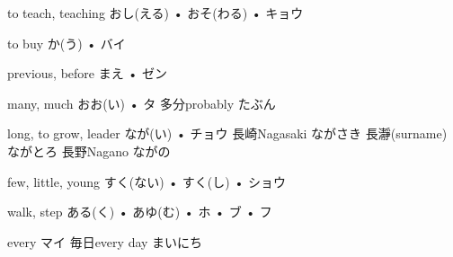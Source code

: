 



\setcounter{cardnum}{137}

		{to teach, teaching}
		{おし(える) • おそ(わる) • キョウ}
		{}{}
		{}{}
		{}{}
		{}{}
		{}{}

		{to buy}
		{か(う) • バイ}
		{}{}
		{}{}
		{}{}
		{}{}
		{}{}

		{previous, before}
		{まえ • ゼン}
		{}{}
		{}{}
		{}{}
		{}{}
		{}{}

		{many, much}
		{おお(い) • タ}
		{多分}{probably たぶん}
		{}{}
		{}{}
		{}{}
		{}{}

		{long, to grow, leader}
		{なが(い) • チョウ}
		{長崎}{Nagasaki ながさき}
		{長瀞}{(surname) ながとろ}
		{長野}{Nagano ながの}
		{}{}
		{}{}

		{few, little, young}
		{すく(ない) • すく(し) • ショウ}
		{}{}
		{}{}
		{}{}
		{}{}
		{}{}

		{walk, step}
		{ある(く) • あゆ(む) • ホ • ブ • フ}
		{}{}
		{}{}
		{}{}
		{}{}
		{}{}

		{every}
		{マイ}
		{毎日}{every day まいにち}
		{}{}
		{}{}
		{}{}
		{}{}

